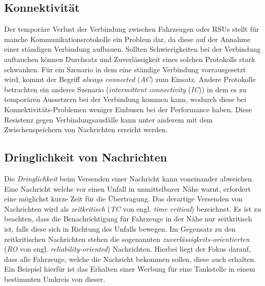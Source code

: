 \documentclass[english,runningheads,a4paper]{llncs}[2018/03/10]
\begin{document}
\subsection{Konnektivität}
Der temporäre Verlust der Verbindung zwischen Fahrzeugen oder RSUs stellt für manche Kommunikationsrotokolle ein Problem dar, da diese auf der Annahme einer ständigen Verbindung aufbauen.
Sollten Schwierigkeiten bei der Verbindung auftauchen können Durchsatz und Zuverlässigkeit eines solchen Protokolls stark schwanken.
Für ein Szenario in dem eine ständige Verbindung vorrausgesetzt wird, kommt der Begriff \textit{always connected} (\textit{AC}) zum Einsatz.
Andere Protokolle betrachten ein anderes Szenario (\textit{intermittent connectivity} (\textit{IC})) in dem es zu temporären Aussetzern bei der Verbindung kommen kann, wodurch diese bei Konnektivitäts-Problemen weniger Einbusen bei der Performance haben.
Diese Resistenz gegen Verbindungsausfälle kann unter anderem mit dem Zwischenspeichern von Nachrichten erreicht werden.


\subsection{Dringlichkeit von Nachrichten}
Die \textit{Dringlichkeit} beim Versenden einer Nachricht kann voneinander abweichen.
Eine Nachricht welche vor einen Unfall in unmittelbarer Nähe warnt, erfordert eine möglichst kurze Zeit für die Übertragung.
Das derartige Versenden von Nachrichten wird als \textit{zeitkritisch} (\textit{TC} von engl. \textit{time critical}) bezeichnet.
Es ist zu beachten, dass die Benachrichtigung für Fahrzeuge in der Nähe nur zeitkritisch ist, falls diese sich in Richtung des Unfalls bewegen.
Im Gegensatz zu den zeitkritischen Nachrichten stehen die sogenannten \textit{zuverlässigkeits-orientierten} (\textit{RO} von engl. \textit{reliability-oriented}) Nachrichten.
Hierbei liegt der Fokus darauf, dass alle Fahrzeuge, welche die Nachricht bekommen sollen, diese auch erhalten.
Ein Beispiel hierfür ist das Erhalten einer Werbung für eine Tankstelle in einem bestimmten Umkreis von dieser.
\end{document}

